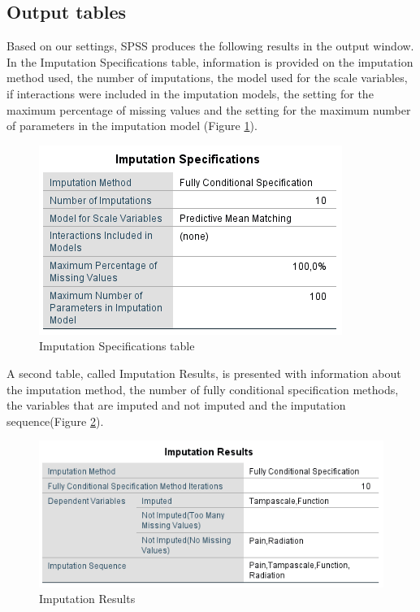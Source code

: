 \documentclass[]{book}
\begin{document}
\subsection{Output tables}\label{output-tables}

Based on our settings, SPSS produces the following results in the output
window. In the Imputation Specifications table, information is provided
on the imputation method used, the number of imputations, the model used
for the scale variables, if interactions were included in the imputation
models, the setting for the maximum percentage of missing values and the
setting for the maximum number of parameters in the imputation model
(Figure \ref{fig:tab4-4}).

\begin{figure}

{\centering \includegraphics[width=0.9\linewidth]{images/tab4.4} 

}

\caption{Imputation Specifications table}\label{fig:tab4-4}
\end{figure}

A second table, called Imputation Results, is presented with information
about the imputation method, the number of fully conditional
specification methods, the variables that are imputed and not imputed
and the imputation sequence(Figure \ref{fig:tab4-5}).

\begin{figure}

{\centering \includegraphics[width=0.9\linewidth]{images/tab4.5} 

}

\caption{Imputation Results}\label{fig:tab4-5}
\end{figure}
\end{document}
